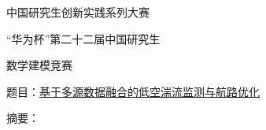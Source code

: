 \begin{center}
{\xinweifont\fontsize{18bp}{30bp}\selectfont 中国研究生创新实践系列大赛\par}
{\xinweifont\fontsize{22bp}{34bp}\selectfont “华为杯”第二十二届中国研究生\par 数学建模竞赛\par}
\vspace{18bp}
{题\quad 目：\quad\underline{基于多源数据融合的低空湍流监测与航路优化}\par}
\vspace{12bp}
{摘\quad 要：\par}
\end{center}

\clearpage
